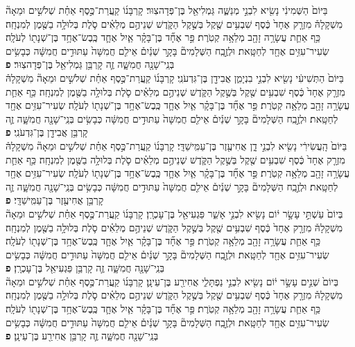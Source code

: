 \documentclass[twoside, openany, parskip=half, 11pt]{book}
\begin{document}
\begin{footnotesize}
\begin{multicols}{2}
בַּיּוֹם֙ הַשְּׁמִינִ֔י נָשִׂ֖יא לִבְנֵ֣י מְנַשֶּׁ֑ה גַּמְלִיאֵ֖ל בֶּן־פְּדָהצֽוּר׃ קָרְבָּנ֜וֹ קַֽעֲרַת־כֶּ֣סֶף אַחַ֗ת שְׁלֹשִׁ֣ים וּמֵאָה֘ מִשְׁקָלָהּ֒ מִזְרָ֤ק אֶחָד֙ כֶּ֔סֶף שִׁבְעִ֥ים שֶׁ֖קֶל בְּשֶׁ֣קֶל הַקֹּ֑דֶשׁ שְׁנֵיהֶ֣ם מְלֵאִ֗ים סֹ֛לֶת בְּלוּלָ֥ה בַשֶּׁ֖מֶן לְמִנְחָֽה׃ כַּ֥ף אַחַ֛ת עֲשָׂרָ֥ה זָהָ֖ב מְלֵאָ֥ה קְטֹֽרֶת׃   פַּ֣ר אֶחָ֞ד בֶּן־בָּקָ֗ר אַ֧יִל אֶחָ֛ד כֶּֽבֶשׂ־אֶחָ֥ד בֶּן־שְׁנָת֖וֹ לְעֹלָֽה׃ שְׂעִיר־עִזִּ֥ים אֶחָ֖ד לְחַטָּֽאת׃ וּלְזֶ֣בַֽח הַשְּׁלָמִים֘ בָּקָ֣ר שְׁנַ֒יִם֒ אֵילִ֤ם חֲמִשָּׁה֙ עַתּוּדִ֣ים חֲמִשָּׁ֔ה כְּבָשִׂ֥ים בְּנֵֽי־שָׁנָ֖ה חֲמִשָּׁ֑ה זֶ֛ה קָרְבַּ֥ן גַּמְלִיאֵ֖ל בֶּן־פְּדָהצֽוּר׃ \textbf{פ} \\
  בַּיּוֹם֙ הַתְּשִׁיעִ֔י נָשִׂ֖יא לִבְנֵ֣י בִנְיָמִ֑ן אֲבִידָ֖ן בֶּן־גִּדְעֹנִֽי׃ קָרְבָּנ֜וֹ קַֽעֲרַת־כֶּ֣סֶף אַחַ֗ת שְׁלֹשִׁ֣ים וּמֵאָה֘ מִשְׁקָלָהּ֒ מִזְרָ֤ק אֶחָד֙ כֶּ֔סֶף שִׁבְעִ֥ים שֶׁ֖קֶל בְּשֶׁ֣קֶל הַקֹּ֑דֶשׁ שְׁנֵיהֶ֣ם מְלֵאִ֗ים סֹ֛לֶת בְּלוּלָ֥ה בַשֶּׁ֖מֶן לְמִנְחָֽה׃ כַּ֥ף אַחַ֛ת עֲשָׂרָ֥ה זָהָ֖ב מְלֵאָ֥ה קְטֹֽרֶת׃ פַּ֣ר אֶחָ֞ד בֶּן־בָּקָ֗ר אַ֧יִל אֶחָ֛ד כֶּֽבֶשׂ־אֶחָ֥ד בֶּן־שְׁנָת֖וֹ לְעֹלָֽה׃ שְׂעִיר־עִזִּ֥ים אֶחָ֖ד לְחַטָּֽאת׃ וּלְזֶ֣בַֽח הַשְּׁלָמִים֘ בָּקָ֣ר שְׁנַ֒יִם֒ אֵילִ֤ם חֲמִשָּׁה֙ עַתּוּדִ֣ים חֲמִשָּׁ֔ה כְּבָשִׂ֥ים בְּנֵֽי־שָׁנָ֖ה חֲמִשָּׁ֑ה זֶ֛ה קָרְבַּ֥ן אֲבִידָ֖ן בֶּן־גִּדְעֹנִֽי׃ \textbf{פ} \\ 
בַּיּוֹם֙ הָֽעֲשִׂירִ֔י נָשִׂ֖יא לִבְנֵ֣י דָ֑ן אֲחִיעֶ֖זֶר בֶּן־עַמִּֽישַׁדָּֽי׃ קָרְבָּנ֜וֹ קַֽעֲרַת־כֶּ֣סֶף אַחַ֗ת שְׁלֹשִׁ֣ים וּמֵאָה֘ מִשְׁקָלָהּ֒ מִזְרָ֤ק אֶחָד֙ כֶּ֔סֶף שִׁבְעִ֥ים שֶׁ֖קֶל בְּשֶׁ֣קֶל הַקֹּ֑דֶשׁ שְׁנֵיהֶ֣ם מְלֵאִ֗ים סֹ֛לֶת בְּלוּלָ֥ה בַשֶּׁ֖מֶן לְמִנְחָֽה׃ כַּ֥ף אַחַ֛ת עֲשָׂרָ֥ה זָהָ֖ב מְלֵאָ֥ה קְטֹֽרֶת׃ פַּ֣ר אֶחָ֞ד בֶּן־בָּקָ֗ר אַ֧יִל אֶחָ֛ד כֶּֽבֶשׂ־אֶחָ֥ד בֶּן־שְׁנָת֖וֹ לְעֹלָֽה׃ שְׂעִיר־עִזִּ֥ים אֶחָ֖ד לְחַטָּֽאת׃ וּלְזֶ֣בַֽח הַשְּׁלָמִים֘ בָּקָ֣ר שְׁנַ֒יִם֒ אֵילִ֤ם חֲמִשָּׁה֙ עַתּוּדִ֣ים חֲמִשָּׁ֔ה כְּבָשִׂ֥ים בְּנֵֽי־שָׁנָ֖ה חֲמִשָּׁ֑ה זֶ֛ה קָרְבַּ֥ן אֲחִיעֶ֖זֶר בֶּן־עַמִּֽישַׁדָּֽי׃ \textbf{פ} \\
בְּיוֹם֙ עַשְׁתֵּ֣י עָשָׂ֣ר י֔וֹם נָשִׂ֖יא לִבְנֵ֣י אָשֵׁ֑ר פַּגְעִיאֵ֖ל בֶּן־עָכְרָֽן׃ קָרְבָּנ֜וֹ קַֽעֲרַת־כֶּ֣סֶף אַחַ֗ת שְׁלֹשִׁ֣ים וּמֵאָה֘ מִשְׁקָלָהּ֒ מִזְרָ֤ק אֶחָד֙ כֶּ֔סֶף שִׁבְעִ֥ים שֶׁ֖קֶל בְּשֶׁ֣קֶל הַקֹּ֑דֶשׁ שְׁנֵיהֶ֣ם מְלֵאִ֗ים סֹ֛לֶת בְּלוּלָ֥ה בַשֶּׁ֖מֶן לְמִנְחָֽה׃ כַּ֥ף אַחַ֛ת עֲשָׂרָ֥ה זָהָ֖ב מְלֵאָ֥ה קְטֹֽרֶת׃ פַּ֣ר אֶחָ֞ד בֶּן־בָּקָ֗ר אַ֧יִל אֶחָ֛ד כֶּֽבֶשׂ־אֶחָ֥ד בֶּן־שְׁנָת֖וֹ לְעֹלָֽה׃ שְׂעִיר־עִזִּ֥ים אֶחָ֖ד לְחַטָּֽאת׃ וּלְזֶ֣בַֽח הַשְּׁלָמִים֘ בָּקָ֣ר שְׁנַ֒יִם֒ אֵילִ֤ם חֲמִשָּׁה֙ עַתּוּדִ֣ים חֲמִשָּׁ֔ה כְּבָשִׂ֥ים בְּנֵֽי־שָׁנָ֖ה חֲמִשָּׁ֑ה זֶ֛ה קָרְבַּ֥ן פַּגְעִיאֵ֖ל בֶּן־עָכְרָֽן׃ \textbf{פ} \\
בְּיוֹם֙ שְׁנֵ֣ים עָשָׂ֣ר י֔וֹם נָשִׂ֖יא לִבְנֵ֣י נַפְתָּלִ֑י אֲחִירַ֖ע בֶּן־עֵינָֽן׃ קָרְבָּנ֜וֹ קַֽעֲרַת־כֶּ֣סֶף אַחַ֗ת שְׁלֹשִׁ֣ים וּמֵאָה֘ מִשְׁקָלָהּ֒ מִזְרָ֤ק אֶחָד֙ כֶּ֔סֶף שִׁבְעִ֥ים שֶׁ֖קֶל בְּשֶׁ֣קֶל הַקֹּ֑דֶשׁ שְׁנֵיהֶ֣ם מְלֵאִ֗ים סֹ֛לֶת בְּלוּלָ֥ה בַשֶּׁ֖מֶן לְמִנְחָֽה׃ כַּ֥ף אַחַ֛ת עֲשָׂרָ֥ה זָהָ֖ב מְלֵאָ֥ה קְטֹֽרֶת׃ פַּ֣ר אֶחָ֞ד בֶּן־בָּקָ֗ר אַ֧יִל אֶחָ֛ד כֶּֽבֶשׂ־אֶחָ֥ד בֶּן־שְׁנָת֖וֹ לְעֹלָֽה׃ שְׂעִיר־עִזִּ֥ים אֶחָ֖ד לְחַטָּֽאת׃ וּלְזֶ֣בַֽח הַשְּׁלָמִים֘ בָּקָ֣ר שְׁנַ֒יִם֒ אֵילִ֤ם חֲמִשָּׁה֙ עַתּוּדִ֣ים חֲמִשָּׁ֔ה כְּבָשִׂ֥ים בְּנֵֽי־שָׁנָ֖ה חֲמִשָּׁ֑ה זֶ֛ה קָרְבַּ֥ן אֲחִירַ֖ע בֶּן־עֵינָֽן׃ \textbf{פ} \\

\end{multicols}
\end{footnotesize}
\end{document}

